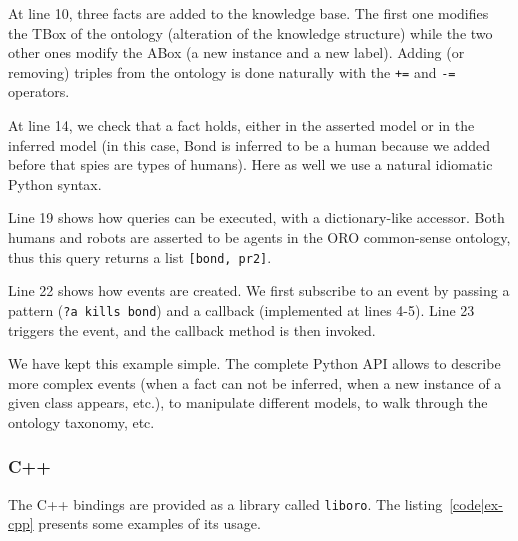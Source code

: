 At line 10, three facts are added to the knowledge base. The first one modifies
the TBox of the ontology (alteration of the knowledge structure) while the two
other ones modify the ABox (a new instance and a new label). Adding (or
removing) triples from the ontology is done naturally with the {\tt +=} and
{\tt -=} operators.

At line 14, we check that a fact holds, either in the asserted model or in the
inferred model (in this case, Bond is inferred to be a human because we added
before that spies are types of humans). Here as well we use a natural idiomatic
Python syntax.

Line 19 shows how queries can be executed, with a dictionary-like accessor.
Both humans and robots are asserted to be agents in the ORO common-sense
ontology, thus this query returns a list {\tt [bond, pr2]}.

Line 22 shows how events are created. We first subscribe to an event by passing
a pattern ({\tt ?a kills bond}) and a callback (implemented at lines 4-5).
Line 23 triggers the event, and the callback method is then invoked.

We have kept this example simple. The complete Python API allows to describe
more complex events (when a fact can not be inferred, when a new instance of a
given class appears, etc.), to manipulate different models, to walk through the
ontology taxonomy, etc.

\subsubsection{C++}

The C++ bindings are provided as a library called {\tt liboro}. The
listing~\ref{code|ex-cpp} presents some examples of its usage.

